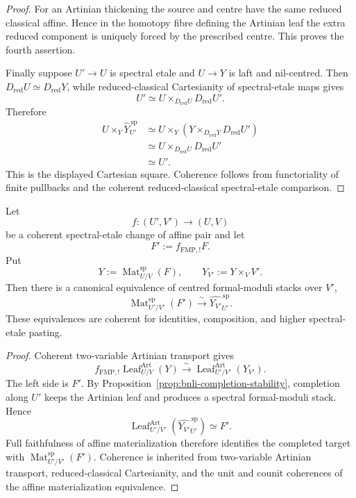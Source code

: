 \begin{proof}
For an Artinian thickening the source and centre have the same reduced
classical affine.  Hence in the homotopy fibre defining the Artinian leaf the
extra reduced component is uniquely forced by the prescribed centre.  This
proves the fourth assertion.

Finally suppose $U'\to U$ is spectral etale and $U\to Y$ is laft and
nil-centred.  Then
$D_{\mathrm{red}}U\simeq D_{\mathrm{red}}Y$, while reduced-classical
Cartesianity of spectral-etale maps gives
\[
    U'
    \simeq
    U\times_{D_{\mathrm{red}}U}D_{\mathrm{red}}U'.
\]
Therefore
\[
\begin{aligned}
    U\times_Y\widehat Y^{\,\mathrm{sp}}_{U'}
    &\simeq
    U\times_Y
    \left(
      Y\times_{D_{\mathrm{red}}Y}D_{\mathrm{red}}U'
    \right)\\
    &\simeq
    U\times_{D_{\mathrm{red}}U}D_{\mathrm{red}}U'\\
    &\simeq U'.
\end{aligned}
\]
This is the displayed Cartesian square.  Coherence follows from functoriality
of finite pullbacks and the coherent reduced-classical spectral-etale
comparison.
\end{proof}

\begin{proposition}
\label{prop:bnli-affine-materialization-etale}
Let
\[
    f:(U',V')\longrightarrow(U,V)
\]
be a coherent spectral-etale change of affine pair and let
\[
    F':=f_{\mathrm{FMP},!}F.
\]
Put
\[
    Y:=\operatorname{Mat}^{\mathrm{sp}}_{U/V}(F),
    \qquad
    Y_{V'}:=Y\times_VV'.
\]
Then there is a canonical equivalence of centred formal-moduli stacks over
$V'$,
\[
\boxed{
    \operatorname{Mat}^{\mathrm{sp}}_{U'/V'}(F')
    \xrightarrow{\sim}
    \widehat{Y_{V'}}^{\,\mathrm{sp}}_{U'}.}
\]
These equivalences are coherent for identities, composition, and higher
spectral-etale pasting.
\end{proposition}

\begin{proof}
Coherent two-variable Artinian transport gives
\[
    f_{\mathrm{FMP},!}
    \operatorname{Leaf}^{\mathrm{Art}}_{U/V}(Y)
    \xrightarrow{\sim}
    \operatorname{Leaf}^{\mathrm{Art}}_{U'/V'}(Y_{V'}).
\]
The left side is $F'$.  By
Proposition~\ref{prop:bnli-completion-stability}, completion along $U'$ keeps
the Artinian leaf and produces a spectral formal-moduli stack.  Hence
\[
    \operatorname{Leaf}^{\mathrm{Art}}_{U'/V'}
    \left(
      \widehat{Y_{V'}}^{\,\mathrm{sp}}_{U'}
    \right)
    \simeq F'.
\]
Full faithfulness of affine materialization therefore identifies the completed
target with
$\operatorname{Mat}^{\mathrm{sp}}_{U'/V'}(F')$.  Coherence is inherited from
two-variable Artinian transport, reduced-classical Cartesianity, and the unit
and counit coherences of the affine materialization equivalence.
\end{proof}

